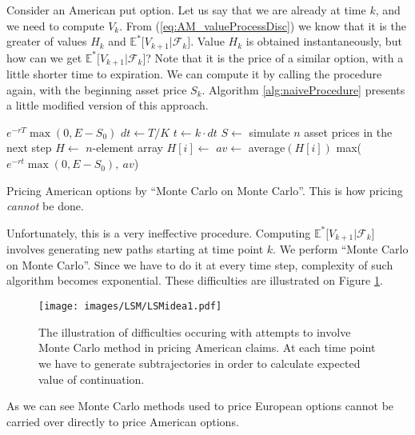 \documentclass[a4paper,11pt, twoside]{book}
\theoremstyle{definition}
\theoremstyle{remark}
\def\Em{{\mathbb{E}^*}}
\begin{document}
Consider an American put option. Let us say that we are already at time $k$, and we need to compute $V_{k}$. From (\ref{eq:AM_valueProcessDisc}) we know that it is the greater of values $H_{k}$ and $\Em\bigl[ V_{k+1} | \mathcal{F}_{k} \bigr]$. Value $H_{k}$ is obtained instantaneously, but how can we get $\Em\bigl[ V_{k+1} | \mathcal{F}_{k} \bigr]$? Note that it is the price of a similar option, with a little shorter time to expiration. We can compute it by calling the procedure again, with the beginning asset price $S_{k}$. Algorithm \ref{alg:naiveProcedure} presents a little modified version of this approach.

\begin{algorithm}
 \begin{algorithmic}[1]
      \State \Return $e^{-rT} \max(0, E - S_0)$
    \EndIf
    \State $dt \gets T/K$
    \State $t \gets k\cdot dt$
    \State $S \gets$ simulate $n$ asset prices in the next step 
    \State $H \gets$ $n$-element array
       \State $H[i] \gets$ 
    \EndFor 
    \State $av \gets$ average$(H[i])$
    \State \Return max($e^{-rt} \max(0, E - S_0),\ av$)
  \EndFunction 
 \end{algorithmic}
 \caption{Pricing American options by ``Monte Carlo on Monte Carlo''. This is how pricing \emph{cannot} be done.}
 \label{alg:naiveProcedure}
\end{algorithm}

Unfortunately, this is a very ineffective procedure. Computing $\Em\bigl[ V_{k+1} | \mathcal{F}_{k} \bigr]$ involves generating new paths starting at time point $k$. We perform ``Monte Carlo on Monte Carlo''. Since we have to do it at every time step, complexity of such algorithm becomes exponential. These difficulties are illustrated on Figure \ref{fig:MC_difficulties}.

\begin{figure}[!ht]
\centering
 \texttt{[image: images/LSM/LSMidea1.pdf]}
\caption{The illustration of difficulties occuring with attempts to involve Monte Carlo method in pricing American claims. At each time point we have to generate subtrajectories in order to calculate expected value of continuation.}
\label{fig:MC_difficulties}
\end{figure}

As we can see Monte Carlo methods used to price European options cannot be carried over directly to price American options.
\end{document}
